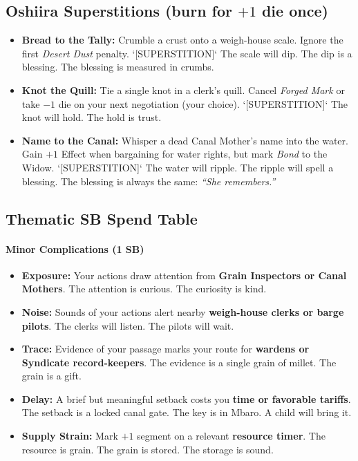 \subsection*{Oshiira Superstitions (burn for $+1$ die once)}
\begin{itemize}
  \item \textbf{Bread to the Tally:} Crumble a crust onto a weigh-house scale. Ignore the first \emph{Desert Dust} penalty. `[SUPERSTITION]` The scale will dip. The dip is a blessing. The blessing is measured in crumbs.

  \item \textbf{Knot the Quill:} Tie a single knot in a clerk's quill. Cancel \emph{Forged Mark} or take $-1$ die on your next negotiation (your choice). `[SUPERSTITION]` The knot will hold. The hold is trust.

  \item \textbf{Name to the Canal:} Whisper a dead Canal Mother's name into the water. Gain $+1$ Effect when bargaining for water rights, but mark \emph{Bond} to the Widow. `[SUPERSTITION]` The water will ripple. The ripple will spell a blessing. The blessing is always the same: \textit{``She remembers.''}
\end{itemize}

\subsection*{Thematic SB Spend Table}
\label{sec:oshiira-sb}

\paragraph{Minor Complications (1 SB)}
\begin{itemize}
\item \textbf{Exposure:} Your actions draw attention from \textbf{Grain Inspectors or Canal Mothers}. The attention is curious. The curiosity is kind.
\item \textbf{Noise:} Sounds of your actions alert nearby \textbf{weigh-house clerks or barge pilots}. The clerks will listen. The pilots will wait.
\item \textbf{Trace:} Evidence of your passage marks your route for \textbf{wardens or Syndicate record-keepers}. The evidence is a single grain of millet. The grain is a gift.
\item \textbf{Delay:} A brief but meaningful setback costs you \textbf{time or favorable tariffs}. The setback is a locked canal gate. The key is in Mbaro. A child will bring it.
\item \textbf{Supply Strain:} Mark $+1$ segment on a relevant \textbf{resource timer}. The resource is grain. The grain is stored. The storage is sound.
\end{itemize}


